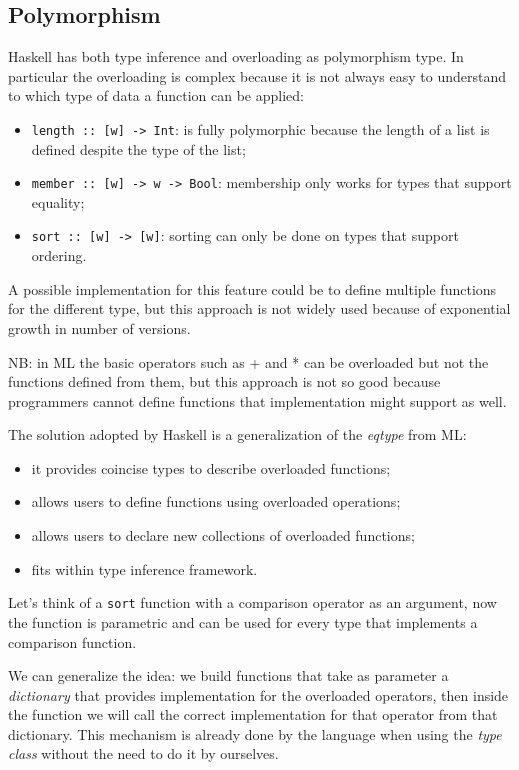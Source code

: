 \subsection{Polymorphism}
Haskell has both type inference and overloading as polymorphism type.
In particular the overloading is complex because it is not always easy to understand to which type of data a function can be applied:
\begin{itemize}
    \item \verb|length :: [w] -> Int|: is fully polymorphic because the length of a list is defined despite the type of the list;
    \item \verb|member :: [w] -> w -> Bool|: membership only works for types that support equality;
    \item \verb|sort :: [w] -> [w]|: sorting can only be done on types that support ordering.
\end{itemize}
A possible implementation for this feature could be to define multiple functions for the different type, but this approach is not widely used because of exponential growth in number of versions.

NB: in ML the basic operators such as + and * can be overloaded but not the functions defined from them, but this approach is not so good because programmers cannot define functions that implementation might support as well.

The solution adopted by Haskell is a generalization of the \emph{eqtype} from ML:
\begin{itemize}
    \item it provides coincise types to describe overloaded functions;
    \item allows users to define functions using overloaded operations;
    \item allows users to declare new collections of overloaded functions;
    \item fits within type inference framework.
\end{itemize}
Let's think of a \verb|sort| function with a comparison operator as an argument, now the function is parametric and can be used for every type that implements a comparison function.

We can generalize the idea: we build functions that take as parameter a \emph{dictionary} that provides implementation for the overloaded operators, then inside the function we will call the correct implementation for that operator from that dictionary.
This mechanism is already done by the language when using the \emph{type class} without the need to do it by ourselves.

